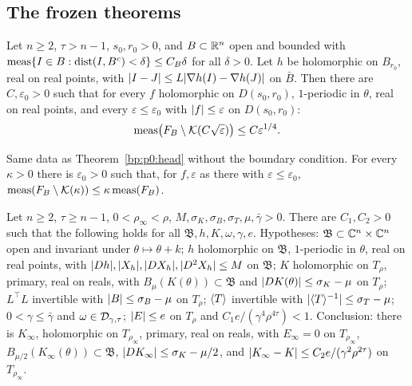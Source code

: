 \subsection{The frozen theorems}\label{bp:p0:theorems}

\begin{theorem}\label{bp:p0:head}
Let $n\ge2$, $\tau>n-1$, $s_0,r_0>0$, and $B\subset\mathbb{R}^n$ open and bounded with
$\operatorname{meas}\{I\in B:\operatorname{dist}(I,B^c)<\delta\}\le C_B\delta$ for all $\delta>0$. Let $h$ be holomorphic on
$B_{r_0}$, real on real points, with $\lvert I-J\rvert\le L\lvert \nabla h(I)-\nabla h(J)\rvert$ on $\bar B$.
Then there are $C,\varepsilon_0>0$ such that for every $f$ holomorphic on $D(s_0,r_0)$,
$1$-periodic in $\theta$, real on real points, and every $\varepsilon\le\varepsilon_0$ with
$\lvert f\rvert\le\varepsilon$ on $D(s_0,r_0)$:
\[\operatorname{meas}\bigl(F_B\setminus\mathcal{K}(C\sqrt\varepsilon)\bigr)\le C\varepsilon^{1/4}.\]
\end{theorem}

\begin{theorem}\label{bp:p0:headq}
Same data as Theorem~\ref{bp:p0:head} without the boundary condition. For every $\kappa>0$ there is
$\varepsilon_0>0$ such that, for $f,\varepsilon$ as there with $\varepsilon\le\varepsilon_0$,
$\operatorname{meas}(F_B\setminus\mathcal{K}(\kappa))\le\kappa\operatorname{meas}(F_B)$.
\end{theorem}

\begin{theorem}\label{bp:p0:g1}
Let $n\ge2$, $\tau\ge n-1$, $0<\rho_\infty<\rho$, $M,\sigma_K,\sigma_B,\sigma_T,\mu,\bar\gamma>0$.
There are $C_1,C_2>0$ such that the following holds for all $\mathfrak{B},h,K,\omega,\gamma,e$.
Hypotheses: $\mathfrak{B}\subset\mathbb{C}^n\times\mathbb{C}^n$ open and invariant under $\theta\mapsto\theta+k$;
$h$ holomorphic on $\mathfrak{B}$, $1$-periodic in $\theta$, real on real points, with
$\lvert Dh\rvert,\lvert X_h\rvert,\lvert DX_h\rvert,\lvert D^2X_h\rvert\le M$ on $\mathfrak{B}$; $K$ holomorphic on $T_\rho$,
primary, real on reals, with $B_\mu(K(\theta))\subset\mathfrak{B}$ and $\lvert DK(\theta)\rvert\le\sigma_K-\mu$
on $T_\rho$; $L^\top L$ invertible with $\lvert B\rvert\le\sigma_B-\mu$ on $T_\rho$; $\langle T\rangle$ invertible
with $\lvert \langle T\rangle^{-1}\rvert\le\sigma_T-\mu$; $0<\gamma\le\bar\gamma$ and $\omega\in\mathcal{D}_{\gamma,\tau}$;
$\lvert E\rvert\le e$ on $T_\rho$ and $C_1e/(\gamma^4\rho^{4\tau})<1$.
Conclusion: there is $K_\infty$, holomorphic on $T_{\rho_\infty}$, primary, real on reals, with
$E_\infty=0$ on $T_{\rho_\infty}$, $B_{\mu/2}(K_\infty(\theta))\subset\mathfrak{B}$,
$\lvert DK_\infty\rvert\le\sigma_K-\mu/2$, and $\lvert K_\infty-K\rvert\le C_2e/(\gamma^2\rho^{2\tau})$ on
$T_{\rho_\infty}$.
\end{theorem}

